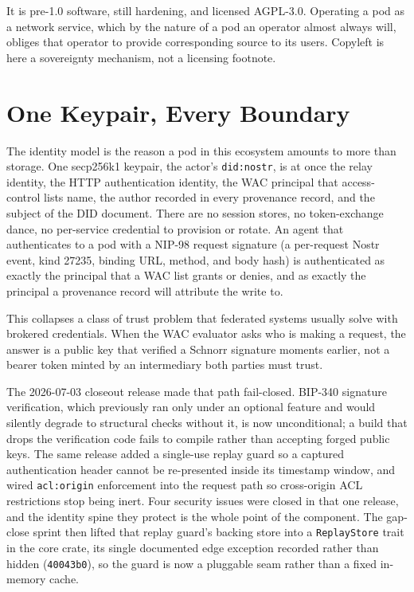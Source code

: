 It is pre-1.0 software, still hardening, and licensed AGPL-3.0. Operating a pod as a network service, which by the nature of a pod an operator almost always will, obliges that operator to provide corresponding source to its users. Copyleft is here a sovereignty mechanism, not a licensing footnote.

\section{One Keypair, Every Boundary}

The identity model is the reason a pod in this ecosystem amounts to more than storage. One secp256k1 keypair, the actor's \texttt{did:nostr}, is at once the relay identity, the HTTP authentication identity, the WAC principal that access-control lists name, the author recorded in every provenance record, and the subject of the DID document. There are no session stores, no token-exchange dance, no per-service credential to provision or rotate. An agent that authenticates to a pod with a NIP-98 request signature (a per-request Nostr event, kind 27235, binding URL, method, and body hash) is authenticated as exactly the principal that a WAC list grants or denies, and as exactly the principal a provenance record will attribute the write to.

This collapses a class of trust problem that federated systems usually solve with brokered credentials. When the WAC evaluator asks who is making a request, the answer is a public key that verified a Schnorr signature moments earlier, not a bearer token minted by an intermediary both parties must trust.

The 2026-07-03 closeout release made that path fail-closed. BIP-340 signature verification, which previously ran only under an optional feature and would silently degrade to structural checks without it, is now unconditional; a build that drops the verification code fails to compile rather than accepting forged public keys. The same release added a single-use replay guard so a captured authentication header cannot be re-presented inside its timestamp window, and wired \texttt{acl:origin} enforcement into the request path so cross-origin ACL restrictions stop being inert. Four security issues were closed in that one release, and the identity spine they protect is the whole point of the component. The gap-close sprint then lifted that replay guard's backing store into a \texttt{ReplayStore} trait in the core crate, its single documented edge exception recorded rather than hidden (\texttt{40043b0}), so the guard is now a pluggable seam rather than a fixed in-memory cache.

